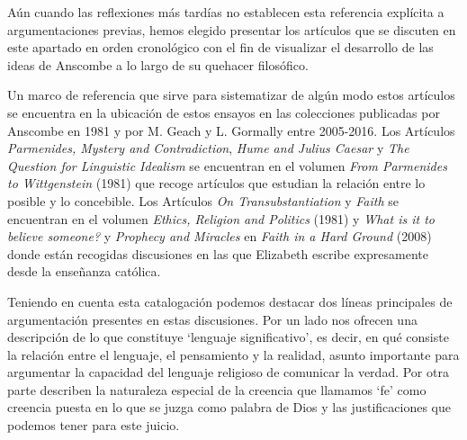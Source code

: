 Aún cuando las reflexiones más tardías no establecen esta referencia explícita a argumentaciones previas, hemos elegido presentar los artículos que se discuten en este apartado en orden cronológico con el fin de visualizar el desarrollo de las ideas de Anscombe a lo largo de su quehacer filosófico. 

Un marco de referencia que sirve para sistematizar de algún modo estos artículos se encuentra en la ubicación de estos ensayos en las colecciones publicadas por Anscombe en 1981 y por M. Geach y L. Gormally entre 2005-2016. Los Artículos \emph{Parmenides, Mystery and Contradiction}, \emph{Hume and Julius Caesar} y \emph{The Question for Linguistic Idealism} se encuentran en el volumen \emph{From Parmenides to Wittgenstein} (1981) que recoge artículos que estudian la relación entre lo posible y lo concebible. Los Artículos \emph{On Transubstantiation} y \emph{Faith} se encuentran en el volumen \emph{Ethics, Religion and Politics} (1981) y \emph{What is it to believe someone?} y \emph{Prophecy and Miracles} en \emph{Faith in a Hard Ground} (2008) donde están recogidas discusiones en las que Elizabeth escribe expresamente desde la enseñanza católica. 

Teniendo en cuenta esta catalogación podemos destacar dos líneas principales de argumentación presentes en estas discusiones. Por un lado nos ofrecen una descripción de lo que constituye `lenguaje significativo', es decir, en qué consiste la relación entre el lenguaje, el pensamiento y la realidad, asunto importante para argumentar la capacidad del lenguaje religioso de comunicar la verdad. Por otra parte describen la naturaleza especial de la creencia que llamamos `fe' como creencia puesta en lo que se juzga como palabra de Dios y las justificaciones que podemos tener para este juicio.
